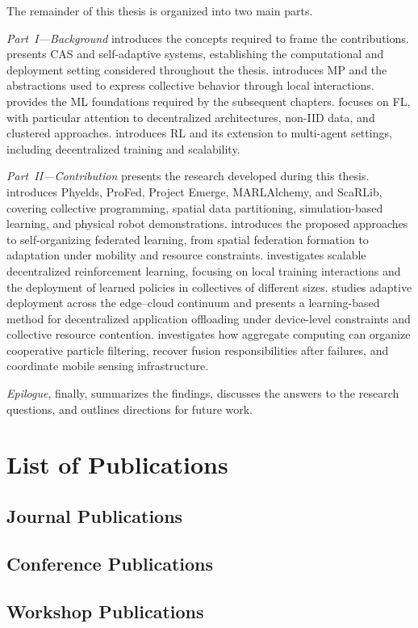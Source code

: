 The remainder of this thesis is organized into two main parts.

\emph{Part~I---Background} introduces the concepts required to frame the contributions. 
%
 presents \gls{CAS} and self-adaptive systems, 
 establishing the computational and deployment setting considered throughout the thesis.
%
 introduces \gls{MP} and the abstractions 
 used to express collective behavior through local interactions.
%
 provides the \gls{ML} foundations required 
 by the subsequent chapters. 
%
 focuses on \gls{FL}, with particular attention to decentralized architectures, 
 non-\gls{IID} data, and clustered approaches. 
% 
 introduces \gls{RL} and its extension to multi-agent settings, 
 including decentralized training and scalability.

\emph{Part~II---Contribution} presents the research developed during this thesis. 
%
 introduces Phyelds, ProFed, Project Emerge, MARLAlchemy, and ScaRLib,
 covering collective programming, spatial data partitioning, 
 simulation-based learning, and physical robot demonstrations.
%
 introduces the proposed approaches to self-organizing federated learning, 
 from spatial federation formation to adaptation under mobility and resource constraints. 
% 
 investigates scalable decentralized reinforcement learning, 
 focusing on local training interactions and the deployment of learned policies 
 in collectives of different sizes. 
% 
 studies adaptive deployment across the edge--cloud continuum and presents a learning-based method 
 for decentralized application offloading under device-level constraints 
 and collective resource contention. 
% 
 investigates how aggregate computing can organize cooperative particle filtering, 
 recover fusion responsibilities after failures, and coordinate mobile sensing infrastructure.

\emph{Epilogue}, finally, 
 summarizes the findings, discusses the
 answers to the research questions, 
 and outlines directions for future work.

\section{List of Publications}

\subsection*{Journal Publications}
\sloppypar
{}

\subsection*{Conference Publications}
\sloppypar
{}

\subsection*{Workshop Publications}
\sloppypar
{}